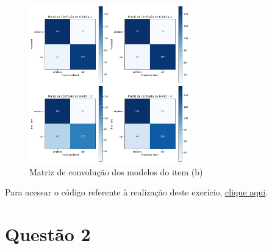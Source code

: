 \documentclass[]{abntex2}
\begin{document}
\begin{figure}[H]
    \centering 
    \includegraphics[width=0.62\textwidth]{imgs/ex1/conf_b.png}
    \caption{Matriz de convolução dos modelos do item (b)}
    \label{fig:1conf_b} %
\end{figure}

Para acessar o código referente à realização deste exerício, \href{https://github.com/lorran-araujo/LNCC/blob/main/disciplinas/redes-neurais/codes/lista3/exercicio1.ipynb}{clique aqui}.




\section*{\textbf{Questão 2}}
\end{document}
